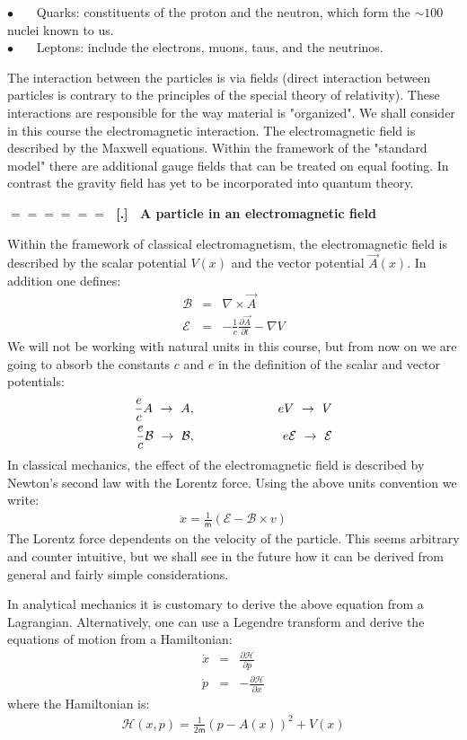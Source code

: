 \documentclass[onecolumn,fleqn]{revtex4}
\newcommand{\mass}{\mathsf{m}}
\newcommand{\bitem}{$\bullet$ \ \ \ }
\newcommand{\beq}{\begin{eqnarray}}
\newcommand{\eeq}{\end{eqnarray}}
\renewcommand{\thesubsection}{\arabic{subsection}}
\renewcommand{\thesubsubsection}{\arabic{subsubsection}}
\newcommand{\sheadC}[1]
{
\addtocounter{subsubsection}{1}
\vspace{5mm}
{\Large\bf $=\!=\!=\!=\!=\!=\;$ [\thesubsection.\thesubsubsection] \ #1}  
\nopagebreak
\phantomsection
}
\begin{document}
\bitem Quarks: constituents of the proton and the neutron, 
which form the $\sim100$ nuclei known to us. \\
\bitem Leptons: include the electrons, muons, taus, and the neutrinos.

The interaction between the particles is via fields 
(direct interaction between particles is contrary to the 
principles of the special theory of relativity). 
These interactions are responsible for the way material is "organized". 
We shall consider in this course the electromagnetic interaction. 
The electromagnetic field is described by the Maxwell equations.
Within the framework of the "standard model" there are 
additional gauge fields that can be treated on equal footing.
In contrast the gravity field has yet to be incorporated 
into quantum theory. 

\sheadC{A particle in an electromagnetic field} 

Within the framework of classical electromagnetism, the electromagnetic 
field is described by the scalar potential ${V(x)}$ and the 
vector potential ${\vec{A}(x)}$. In addition one defines:
\beq
\mathcal{B} 
&=& \nabla \times \vec{A} 
\\ \nonumber
\mathcal{E} 
&=& - \frac{1}{c} \frac{ \partial \vec{A}}{\partial {t}} - \nabla{V}
\eeq
We will not be working with natural units in this 
course, but from now on we are going to absorb 
the constants $c$ and $e$ in the definition 
of the scalar and vector potentials: 
\beq
\frac{e}{c} A  \ \rightarrow \ A,
&\hspace*{2cm}&
eV \ \rightarrow \ V 
\\ \nonumber
\frac{e}{c} \mathcal{B}  \ \rightarrow \ \mathcal{B}, 
&\hspace*{2cm}&
e\mathcal{E} \ \rightarrow \ \mathcal{E}
\eeq
In classical mechanics, the effect of the electromagnetic 
field is described by Newton's second law with the Lorentz
force. Using the above units convention we write: 
\beq
\ddot{x} = \frac{1}{\mass} \left(\mathcal{E} 
- \mathcal{B} \times v \right)
\eeq
The Lorentz force dependents on the velocity of 
the particle. This seems arbitrary and counter intuitive, 
but we shall see in the future how it can be derived 
from general and fairly simple considerations.   

In analytical mechanics it is customary to derive 
the above equation from a Lagrangian. Alternatively, 
one can use a Legendre transform and derive the equations 
of motion from a Hamiltonian:
\beq
\dot{x} &=& \frac{\partial{\mathcal{H}}}{\partial{p}} 
\\ \nonumber
\dot{p} &=& -\frac{\partial{\mathcal{H}}}{\partial{x}} 
\eeq
where the Hamiltonian is: 
\beq
\mathcal{H}(x,p) = \frac{1}{2\mass}(p-A(x))^2 + V(x) 
\eeq
\end{document}
